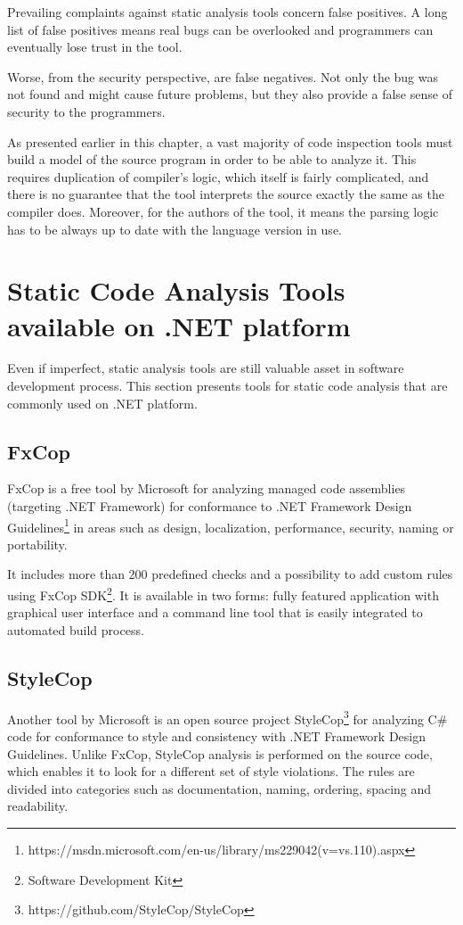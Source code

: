 \documentclass[
  digital, %
  table,   %
  lof,     %
  lot,     %
  oneside,
]{fithesis3}
\begin{document}
Prevailing complaints against static analysis tools concern false positives. A long list of false positives means real bugs can be overlooked and programmers can eventually lose trust in the tool.

Worse, from the security perspective, are false negatives. Not only the bug was not found and might cause future problems, but they also provide a false sense of security to the programmers. 

As presented earlier in this chapter, a vast majority of code inspection tools must build a model of the source program in order to be able to analyze it. This requires duplication of compiler's logic, which itself is fairly complicated, and there is no guarantee that the tool interprets the source exactly the same as the compiler does. Moreover, for the authors of the tool, it means the parsing logic has to be always up to date with the language version in use. 

\section{Static Code Analysis Tools available on .NET platform}
Even if imperfect, static analysis tools are still valuable asset in software development process. This section presents tools for static code analysis that are commonly used on .NET platform.

\subsection{FxCop}
FxCop is a free tool by Microsoft for analyzing managed code assemblies (targeting .NET Framework) for conformance to .NET Framework Design Guidelines\footnote{https://msdn.microsoft.com/en-us/library/ms229042(v=vs.110).aspx} in areas such as design, localization, performance, security, naming or portability. 

It includes more than 200 predefined checks and a possibility to add custom rules using FxCop SDK\footnote{Software Development Kit}. It is available in two forms: fully featured application with graphical user interface and a command line tool that is easily integrated to automated build process. 

\subsection{StyleCop}
Another tool by Microsoft is an open source project StyleCop\footnote{https://github.com/StyleCop/StyleCop} for analyzing C\# code for conformance to style and consistency with .NET Framework Design Guidelines. Unlike FxCop, StyleCop analysis is performed on the source code, which enables it to look for a different set of style violations. The rules are divided into categories such as documentation, naming, ordering, spacing and readability. 
\end{document}
